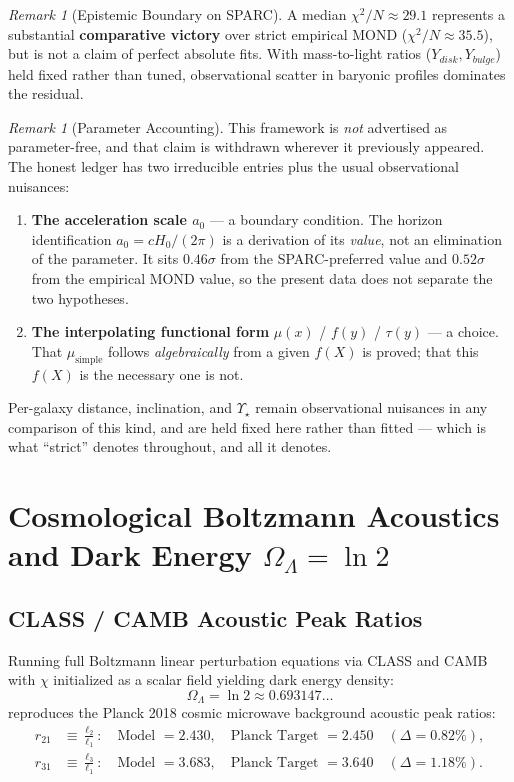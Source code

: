 \documentclass[11pt,a4paper]{article}
\theoremstyle{plain}
\theoremstyle{definition}
\theoremstyle{remark}
\newtheorem{remark}[theorem]{Remark}
\begin{document}
\begin{remark}[Epistemic Boundary on SPARC]
A median $\chi^2/N \approx 29.1$ represents a substantial \textbf{comparative victory} over strict empirical MOND ($\chi^2/N \approx 35.5$), but is not a claim of perfect absolute fits. With mass-to-light ratios ($Y_{disk}, Y_{bulge}$) held fixed rather than tuned, observational scatter in baryonic profiles dominates the residual.
\end{remark}


\begin{remark}[Parameter Accounting]
This framework is \emph{not} advertised as parameter-free, and that claim is
withdrawn wherever it previously appeared. The honest ledger has two
irreducible entries plus the usual observational nuisances:

\begin{enumerate}
  \item \textbf{The acceleration scale $a_0$} --- a boundary condition. The
        horizon identification $a_0 = cH_0/(2\pi)$ is a derivation of its
        \emph{value}, not an elimination of the parameter. It sits
        $0.46\sigma$ from the SPARC-preferred value and $0.52\sigma$ from the
        empirical MOND value, so the present data does not separate the two
        hypotheses.
  \item \textbf{The interpolating functional form} $\mu(x)$ / $f(y)$ /
        $\tau(y)$ --- a choice. That $\mu_{\text{simple}}$ follows
        \emph{algebraically} from a given $f(X)$ is proved; that this $f(X)$ is
        the necessary one is not.
\end{enumerate}

Per-galaxy distance, inclination, and $\Upsilon_\star$ remain observational
nuisances in any comparison of this kind, and are held fixed here rather than
fitted --- which is what ``strict'' denotes throughout, and all it denotes.
\end{remark}

\section{Cosmological Boltzmann Acoustics and Dark Energy $\Omega_\Lambda = \ln 2$}

\subsection{CLASS / CAMB Acoustic Peak Ratios}
Running full Boltzmann linear perturbation equations via CLASS and CAMB with $\chi$ initialized as a scalar field yielding dark energy density:
\begin{equation}
\Omega_\Lambda = \ln 2 \approx 0.693147\dots
\end{equation}
reproduces the Planck 2018 cosmic microwave background acoustic peak ratios:
\begin{align}
r_{21} &\equiv \frac{\ell_2}{\ell_1}: \quad \text{Model } = 2.430, \quad \text{Planck Target } = 2.450 \quad (\Delta = 0.82\%), \\
r_{31} &\equiv \frac{\ell_3}{\ell_1}: \quad \text{Model } = 3.683, \quad \text{Planck Target } = 3.640 \quad (\Delta = 1.18\%).
\end{align}
\end{document}
